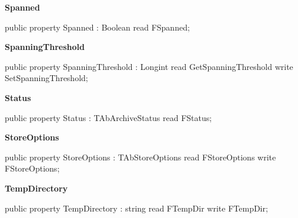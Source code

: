 \documentclass{report}
\newif\ifpdf
\begin{document}
\begin{list}{}
\begin{flushleft}
\ifpdf
\end{flushleft}
\fi


\par  \label{AbArcTyp.TAbArchive-Spanned}
\item[\textbf{Spanned}\hfill]
\ifpdf
\begin{flushleft}
\fi
\begin{ttfamily}
public property Spanned : Boolean
      read FSpanned;\end{ttfamily}

\ifpdf
\end{flushleft}
\fi


\par  \label{AbArcTyp.TAbArchive-SpanningThreshold}
\item[\textbf{SpanningThreshold}\hfill]
\ifpdf
\begin{flushleft}
\fi
\begin{ttfamily}
public property SpanningThreshold : Longint
      read  GetSpanningThreshold
      write SetSpanningThreshold;\end{ttfamily}

\ifpdf
\end{flushleft}
\fi


\par  \label{AbArcTyp.TAbArchive-Status}
\item[\textbf{Status}\hfill]
\ifpdf
\begin{flushleft}
\fi
\begin{ttfamily}
public property Status : TAbArchiveStatus
      read FStatus;\end{ttfamily}

\ifpdf
\end{flushleft}
\fi


\par  \label{AbArcTyp.TAbArchive-StoreOptions}
\item[\textbf{StoreOptions}\hfill]
\ifpdf
\begin{flushleft}
\fi
\begin{ttfamily}
public property StoreOptions : TAbStoreOptions
      read FStoreOptions
      write FStoreOptions;\end{ttfamily}

\ifpdf
\end{flushleft}
\fi


\par  \label{AbArcTyp.TAbArchive-TempDirectory}
\item[\textbf{TempDirectory}\hfill]
\ifpdf
\begin{flushleft}
\fi
\begin{ttfamily}
public property TempDirectory : string
      read FTempDir
      write FTempDir;\end{ttfamily}


\end{flushleft}
\end{list}
\end{document}
